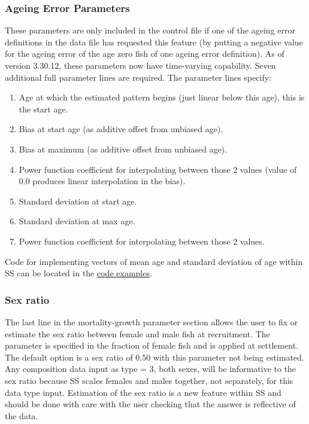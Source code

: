 \subsubsection{Ageing Error Parameters}
These parameters are only included in the control file if one of the ageing error definitions in the data file has requested this feature (by putting a negative value for the ageing error of the age zero fish of one ageing error definition). As of version 3.30.12, these parameters now have time-varying capability. Seven additional full parameter lines are required. The parameter lines specify:
\begin{enumerate}
	\item Age at which the estimated pattern begins (just linear below this age), this is the start age.
	\item Bias at start age (as additive offset from unbiased age).
	\item Bias at maximum (as additive offset from unbiased age).
	\item Power function coefficient for interpolating between those 2 values (value of 0.0 produces linear interpolation in the bias).
	\item Standard deviation at start age.
	\item Standard deviation at max age.
	\item Power function coefficient for interpolating between those 2 values.
\end{enumerate}

\noindent Code for implementing vectors of mean age and standard deviation of age within SS can be located in the \hyperlink{CodeEx}{code examples}.

\subsubsection{Sex ratio}
The last line in the mortality-growth parameter section allows the user to fix or estimate the sex ratio between female and male fish at recruitment.  The parameter is specified in the fraction of female fish and is applied at settlement. The default option is a sex ratio of 0.50 with this parameter not being estimated.  Any composition data input as type = 3, both sexes, will be informative to the sex ratio because SS scales females and males together, not separately, for this data type input. Estimation of the sex ratio is a new feature within SS and should be done with care with the user checking that the answer is reflective of the data.


